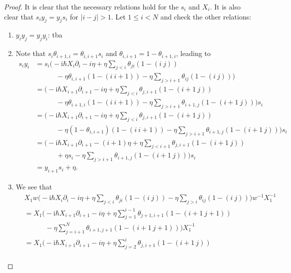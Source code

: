 \documentclass[11pt]{report}
\theoremstyle{definition}
\theoremstyle{remark}
\theoremstyle{remark}
\newcommand{\I}{\mathrm{i}}
\begin{document}
\begin{proof}
It is clear that the necessary relations hold for the $s_i$ and $X_i$. It is also clear that $s_i y_j = y_j s_i$ for $|i-j|>1$. Let $1 \leq i < N$ and check the other relations:
\begin{enumerate}[label=(\roman*)]
\item $y_i y_j = y_j y_i$: tba
\item Note that $s_i \theta_{i+1,i} = \theta_{i,i+1} s_i$ and $\theta_{i,i+1} = 1 - \theta_{i+1,i}$, leading to
\begin{align*}
s_i y_i
&= s_i \bigg( -\I \hbar X_i \partial_i - i \eta + \eta \sum_{j < i} \theta_{ji} (1-(i \ j)) \\
&\quad \quad \quad - \eta \theta_{i,i+1} (1-(i \ i+1)) - \eta \sum_{j > i+1} \theta_{ij} (1-(i \ j)) \bigg) \\
&= \bigg( -\I \hbar X_{i+1} \partial_{i+1} - i \eta + \eta \sum_{j < i} \theta_{j,i+1} (1-(i+1 \ j)) \\
&\quad \quad \quad - \eta \theta_{i+1,i} (1-(i \ i+1)) - \eta \sum_{j > i+1} \theta_{i+1,j} (1-(i+1 \ j)) \bigg) s_i \\
&= \bigg( -\I \hbar X_{i+1} \partial_{i+1} - i \eta + \eta \sum_{j < i} \theta_{j,i+1} (1-(i+1 \ j)) \\
&\quad \quad \quad - \eta (1-\theta_{i,i+1}) (1-(i \ i+1)) - \eta \sum_{j > i+1} \theta_{i+1,j} (1-(i+1 \ j)) \bigg) s_i \\
&= \bigg( -\I \hbar X_{i+1} \partial_{i+1} - (i+1) \eta + \eta \sum_{j < i+1} \theta_{j,i+1} (1-(i+1 \ j)) \\
&\quad \quad \quad + \eta s_i - \eta \sum_{j > i+1} \theta_{i+1,j} (1-(i+1 \ j)) \bigg) s_i \\
&= y_{i+1} s_i + \eta.
\end{align*}
\item We see that
\begin{align*}
&X_1 w \bigg( -\I \hbar X_i \partial_i - i \eta + \eta \sum_{j < i} \theta_{ji} (1-(i \ j)) - \eta \sum_{j > i} \theta_{ij} (1-(i \ j)) \bigg) w^{-1} X_1^{-1} \\
&= X_1 \bigg( -\I \hbar X_{i+1} \partial_{i+1} - i \eta + \eta \sum_{j=1}^{i-1} \theta_{j+1,i+1} (1-(i+1 \ j+1)) \\
&\quad \quad \quad - \eta \sum_{j=i+1}^N \theta_{i+1,j+1} (1-(i+1 \ j+1)) \bigg) X_1^{-1} \\
&= X_1 \bigg( -\I \hbar X_{i+1} \partial_{i+1} - i \eta + \eta \sum_{j=2}^{i} \theta_{j,i+1} (1-(i+1 \ j)) \\

\end{align*}
\end{enumerate}
\end{proof}
\end{document}
